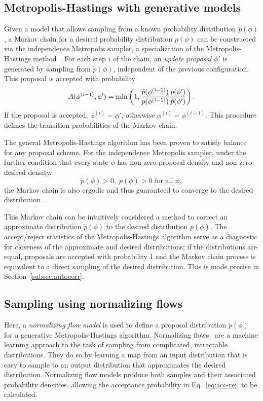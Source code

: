 \subsection{Metropolis-Hastings with generative models}
\label{subsec:generative-metropolis}
%
Given a model that allows sampling from a known probability distribution $\tilde{p}(\phi)$, a Markov chain for a desired probability distribution $p(\phi)$ can be constructed via the independence Metropolis sampler, a specialization of the Metropolis-Hastings method~\cite{tierney1994}. For each step $i$ of the chain, an {\it update proposal} $\phi'$ is generated by sampling from $\tilde{p}(\phi)$, independent of the previous configuration. This proposal is accepted with probability
%
\begin{equation}
A(\phi^{(i-1)},\phi') = \min\left(1, \frac{\tilde{p}(\phi^{(i-1)}) }{ p(\phi^{(i-1)})} \frac{p(\phi')}{\tilde{p}(\phi')}\right).
\label{eq:acc-rej}
\end{equation}
%
%
If the proposal is accepted, $\phi^{(i)} = \phi'$, otherwise $\phi^{(i)} = \phi^{(i-1)}$. This procedure defines the transition probabilities of the Markov chain.

The general Metropolis-Hastings algorithm has been proven to satisfy balance~\cite{hastings70} for any proposal scheme. For the independence Metropolis sampler, under the further condition that every state $\phi$ has non-zero proposal density and non-zero desired density,
%
\begin{equation}
    \tilde{p}(\phi) > 0, \; p(\phi) > 0 \text{ for all } \phi,
\end{equation}
%
the Markov chain is also ergodic and thus guaranteed to converge to the desired distribution~\cite{tierney1994}.

This Markov chain can be intuitively considered a method to correct an approximate distribution $\tilde{p}(\phi)$ to the desired distribution $p(\phi)$. The accept/reject statistics of the Metropolis-Hastings algorithm serve as a diagnostic for closeness of the approximate and desired distributions; if the distributions are equal, proposals are accepted with probability 1 and the Markov chain process is equivalent to a direct sampling of the desired distribution. This is made precise in Section~\ref{subsec:autocorr}.


\subsection{Sampling using normalizing flows}
\label{subsec:normalizing-flows}
Here, a {\it normalizing flow model} is used to define a proposal distribution $\tilde{p}(\phi)$ for a generative Metropolis-Hastings algorithm. Normalizing flows~\cite{rezende2015nf} are a machine learning approach to the task of sampling from complicated, intractable distributions. They do so by learning a map from an input distribution that is easy to sample to an output distribution that approximates the desired distribution. Normalizing flow models produce both samples and their associated probability densities, allowing the acceptance probability in Eq.~\eqref{eq:acc-rej} to be calculated.

